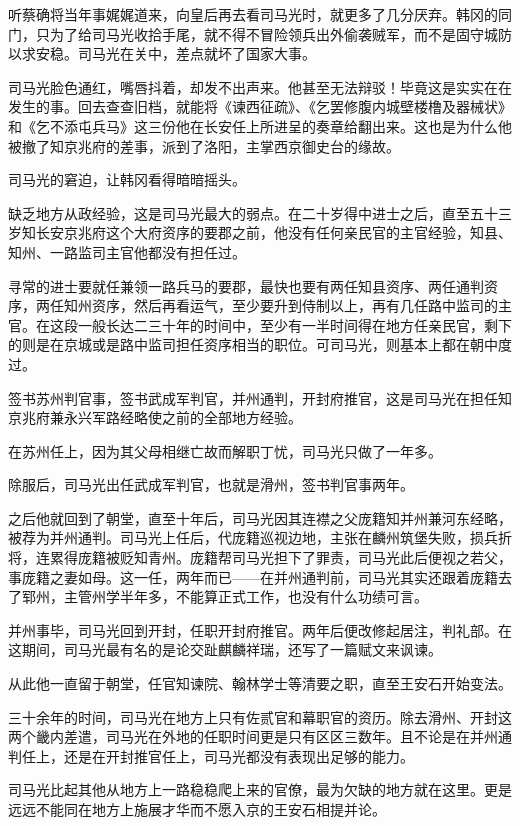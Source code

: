 听蔡确将当年事娓娓道来，向皇后再去看司马光时，就更多了几分厌弃。韩冈的同门，只为了给司马光收拾手尾，就不得不冒险领兵出外偷袭贼军，而不是固守城防以求安稳。司马光在关中，差点就坏了国家大事。

司马光脸色通红，嘴唇抖着，却发不出声来。他甚至无法辩驳！毕竟这是实实在在发生的事。回去查查旧档，就能将《谏西征疏》、《乞罢修腹内城壁楼橹及器械状》和《乞不添屯兵马》这三份他在长安任上所进呈的奏章给翻出来。这也是为什么他被撤了知京兆府的差事，派到了洛阳，主掌西京御史台的缘故。

司马光的窘迫，让韩冈看得暗暗摇头。

缺乏地方从政经验，这是司马光最大的弱点。在二十岁得中进士之后，直至五十三岁知长安京兆府这个大府资序的要郡之前，他没有任何亲民官的主官经验，知县、知州、一路监司主官他都没有担任过。

寻常的进士要就任兼领一路兵马的要郡，最快也要有两任知县资序、两任通判资序，两任知州资序，然后再看运气，至少要升到侍制以上，再有几任路中监司的主官。在这段一般长达二三十年的时间中，至少有一半时间得在地方任亲民官，剩下的则是在京城或是路中监司担任资序相当的职位。可司马光，则基本上都在朝中度过。

签书苏州判官事，签书武成军判官，并州通判，开封府推官，这是司马光在担任知京兆府兼永兴军路经略使之前的全部地方经验。

在苏州任上，因为其父母相继亡故而解职丁忧，司马光只做了一年多。

除服后，司马光出任武成军判官，也就是滑州，签书判官事两年。

之后他就回到了朝堂，直至十年后，司马光因其连襟之父庞籍知并州兼河东经略，被荐为并州通判。司马光上任后，代庞籍巡视边地，主张在麟州筑堡失败，损兵折将，连累得庞籍被贬知青州。庞籍帮司马光担下了罪责，司马光此后便视之若父，事庞籍之妻如母。这一任，两年而已——在并州通判前，司马光其实还跟着庞籍去了郓州，主管州学半年多，不能算正式工作，也没有什么功绩可言。

并州事毕，司马光回到开封，任职开封府推官。两年后便改修起居注，判礼部。在这期间，司马光最有名的是论交趾麒麟祥瑞，还写了一篇赋文来讽谏。

从此他一直留于朝堂，任官知谏院、翰林学士等清要之职，直至王安石开始变法。

三十余年的时间，司马光在地方上只有佐贰官和幕职官的资历。除去滑州、开封这两个畿内差遣，司马光在外地的任职时间更是只有区区三数年。且不论是在并州通判任上，还是在开封推官任上，司马光都没有表现出足够的能力。

司马光比起其他从地方上一路稳稳爬上来的官僚，最为欠缺的地方就在这里。更是远远不能同在地方上施展才华而不愿入京的王安石相提并论。

